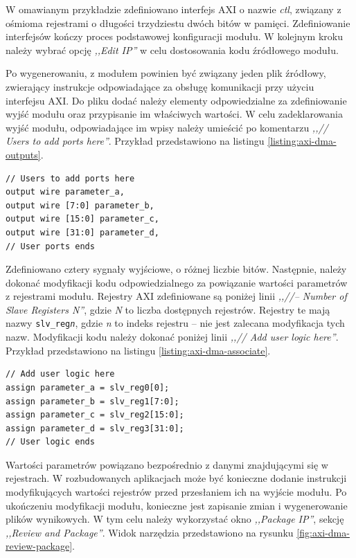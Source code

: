 W omawianym przykładzie zdefiniowano interfejs AXI o nazwie \emph{ctl}, związany z ośmioma rejestrami o długości trzydziestu dwóch bitów w pamięci.
Zdefiniowanie interfejsów kończy proces podstawowej konfiguracji modułu. W kolejnym kroku należy wybrać opcję \emph{,,Edit IP''} w celu dostosowania kodu źródłowego modułu.

Po wygenerowaniu, z modułem powinien być związany jeden plik źródłowy, zwierający instrukcje odpowiadające za obsługę komunikacji przy użyciu interfejsu AXI.
Do pliku dodać należy elementy odpowiedzialne za zdefiniowanie wyjść modułu oraz przypisanie im właściwych wartości.
W celu zadeklarowania wyjść modułu, odpowiadające im wpisy należy umieścić po komentarzu \emph{,,// Users to add ports here''}. Przykład przedstawiono na listingu \ref{listing:axi-dma-outputs}.

\begin{lstlisting}[breaklines, label=listing:axi-dma-outputs, caption=Definicja interfejsów wyjściowych modułu.]
// Users to add ports here
output wire parameter_a,
output wire [7:0] parameter_b,
output wire [15:0] parameter_c,
output wire [31:0] parameter_d,
// User ports ends
\end{lstlisting}

Zdefiniowano cztery sygnały wyjściowe, o różnej liczbie bitów.
Następnie, należy dokonać modyfikacji kodu odpowiedzialnego za powiązanie wartości parametrów z rejestrami modułu. 
Rejestry AXI zdefiniowane są poniżej linii \emph{,,//-- Number of Slave Registers N''}, gdzie \emph{N} to liczba dostępnych rejestrów. Rejestry te mają nazwy \texttt{slv\_reg\emph{n}}, gdzie \emph{n} to indeks rejestru -- nie jest zalecana modyfikacja tych nazw.
Modyfikacji kodu należy dokonać poniżej linii \emph{,,// Add user logic here''}. 
Przykład przedstawiono na listingu \ref{listing:axi-dma-associate}.

\begin{lstlisting}[breaklines, label=listing:axi-dma-associate, caption=Powiązanie wyjść z rejestrami modułu.]
// Add user logic here
assign parameter_a = slv_reg0[0];
assign parameter_b = slv_reg1[7:0];
assign parameter_c = slv_reg2[15:0];
assign parameter_d = slv_reg3[31:0];
// User logic ends
\end{lstlisting}

Wartości parametrów powiązano bezpośrednio z danymi znajdującymi się w rejestrach. 
W rozbudowanych aplikacjach może być konieczne dodanie instrukcji modyfikujących wartości rejestrów przed przesłaniem ich na wyjście modułu.
Po ukończeniu modyfikacji modułu, konieczne jest zapisanie zmian i wygenerowanie plików wynikowych. 
W tym celu należy wykorzystać okno \emph{,,Package IP''}, sekcję \emph{,,Review and Package''}. 
Widok narzędzia przedstawiono na rysunku \ref{fig:axi-dma-review-package}.

